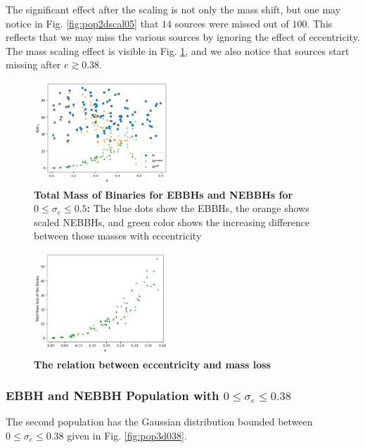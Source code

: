 \documentclass[twocolumn,prd,nofootinbib]{revtex4}
\begin{document}
The significant effect after the scaling is not only the mass shift, but one may notice in Fig. \ref{fig:pop2dscal05} that $14$ sources were missed out of $100$. This reflects that we may miss the various sources by ignoring the effect of eccentricity. The mass scaling effect is visible in Fig. \ref{fig:pop2d05diff}, and we also notice that sources start missing after $e \gtrsim 0.38$.

\begin{figure}[H]
\includegraphics[width=0.45\textwidth]{paper/figures/pop2d05diff.png}
\caption{\label{fig:pop2d05diff}\textbf{Total Mass of Binaries for EBBHs and NEBBHs for $0\leq \sigma_e \leq 0.5$:} The blue dots show the EBBHs, the orange shows scaled NEBBHs, and green color shows the increasing difference between those masses with eccentricity}
\end{figure}

\begin{figure}[H]
\includegraphics[width=0.45\textwidth]{paper/figures/massloss05.png}
\caption{\label{fig:population05}\textbf{The relation between eccentricity and mass loss}}
\end{figure}



\subsubsection{EBBH and NEBBH Population with $0\leq \sigma_e \leq 0.38$}
 The second population has the Gaussian distribution bounded between $0\leq \sigma_e \leq 0.38$ given in Fig. \ref{fig:pop3d038}.  
\end{document}
